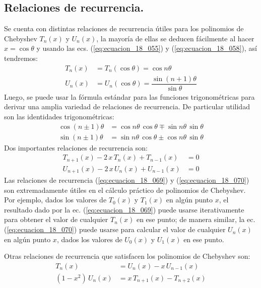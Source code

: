 \documentclass[12pt]{article}
\numberwithin{equation}{section}
\begin{document}
\subsection{Relaciones de recurrencia.}

Se cuenta con distintas relaciones de recurrencia útiles para los polinomios de Chebyshev $T_{n}(x)$ y $U_{n}(x)$, la mayoría de ellas se deducen fácilmente al hacer $x = \cos \theta$ y usando las ecs. (\ref{eq:ecuacion_18_055}) y (\ref{eq:ecuacion_18_058}), así tendremos:
\begin{align}
T_{n} (x) &= T_{n} (\cos \theta) = \cos n \theta \label{eq:ecuacion_18_065} \\[0.5em]
U_{n} (x) &= U_{n} (\cos \theta) = \dfrac{\sin (n + 1) \theta}{\sin \theta} \label{eq:ecuacion_18_066} 
\end{align}
Luego, se puede usar la fórmula estándar para las funciones trigonométricas para derivar una amplia variedad de relaciones de recurrencia. De particular utilidad son las identidades trigonométricas:
\begin{align}
\cos (n \pm 1)\theta &= \cos n \theta \, \cos \theta \mp \sin n \theta \, \sin \theta \label{eq:ecuacion_18_067} \\[0.5em]
\sin (n \pm 1)\theta &= \sin n \theta \, \cos \theta \pm \cos n \theta \, \sin \theta \label{eq:ecuacion_18_068}
\end{align}
Dos importantes relaciones de recurrencia son:
\begin{align}
T_{n+1} (x) - 2 \, x \, T_{n} (x) + T_{n-1} (x) &= 0 \label{eq:ecuacion_18_069} \\[0.5em]
U_{n+1} (x) - 2 \, x \, U_{n} (x) + U_{n-1} (x) &= 0 \label{eq:ecuacion_18_070}
\end{align}
Las relaciones de recurrencia (\ref{eq:ecuacion_18_069}) y (\ref{eq:ecuacion_18_070}) son extremadamente útiles en el cálculo práctico de polinomios de Chebyshev. Por ejemplo, dados los valores de $T_{0} (x)$ y $T_{1} (x)$ en algún punto $x$, el resultado dado por la ec. (\ref{eq:ecuacion_18_069}) puede usarse iterativamente para obtener el valor de cualquier $T_{n} (x)$ en ese punto; de manera similar, la ec. (\ref{eq:ecuacion_18_070}) puede usarse para calcular el valor de cualquier $U_{n} (x)$ en algún punto $x$, dados los valores de $U_{0} (x)$ y $U_{1} (x)$ en ese punto.
\par
Otras relaciones de recurrencia que satisfacen los polinomios de Chebyshev son:
\begin{align}
T_{n} (x) &= U_{n}(x) - x \, U_{n-1} (x) \label{eq:ecuacion_18_071} \\[0.5em]
(1 - x^{2}) \, U_{n} (x) &= x \, T_{n+1} (x) - T_{n+2} (x) \label{eq:ecuacion_18_072}
\end{align}
\end{document}
